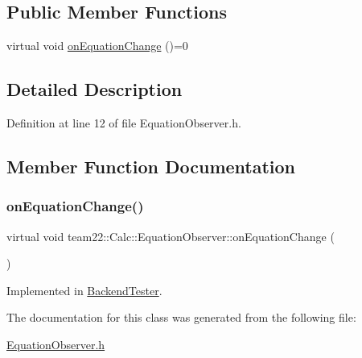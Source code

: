 \subsection*{Public Member Functions}
\begin{DoxyCompactItemize}
\item 
virtual void \hyperlink{classteam22_1_1_calc_1_1_equation_observer_a2fc2a1f8583f27b0087ff6053895ef25}{on\+Equation\+Change} ()=0
\end{DoxyCompactItemize}


\subsection{Detailed Description}


Definition at line 12 of file Equation\+Observer.\+h.



\subsection{Member Function Documentation}
\mbox{\label{classteam22_1_1_calc_1_1_equation_observer_a2fc2a1f8583f27b0087ff6053895ef25}} 
\subsubsection{\texorpdfstring{on\+Equation\+Change()}{onEquationChange()}}
{\footnotesize\ttfamily virtual void team22\+::\+Calc\+::\+Equation\+Observer\+::on\+Equation\+Change (\begin{DoxyParamCaption}{ }\end{DoxyParamCaption})\hspace{0.3cm}{\ttfamily [pure virtual]}}



Implemented in \hyperlink{class_backend_tester_a9b7caf17f8ad274936fab5ca4bc669f8}{Backend\+Tester}.



The documentation for this class was generated from the following file\+:\begin{DoxyCompactItemize}
\item 
\hyperlink{_equation_observer_8h}{Equation\+Observer.\+h}\end{DoxyCompactItemize}
